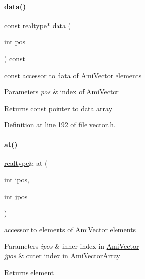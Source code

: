 \paragraph{\texorpdfstring{data()}{data()}\hspace{0.1cm}{\footnotesize\ttfamily [2/2]}}
{\footnotesize\ttfamily const \mbox{\hyperlink{namespaceamici_a1bdce28051d6a53868f7ccbf5f2c14a3}{realtype}}$\ast$ data (\begin{DoxyParamCaption}\item[{int}]{pos }\end{DoxyParamCaption}) const}

const accessor to data of \mbox{\hyperlink{classamici_1_1_ami_vector}{Ami\+Vector}} elements 
\begin{DoxyParams}{Parameters}
{\em pos} & index of \mbox{\hyperlink{classamici_1_1_ami_vector}{Ami\+Vector}} \\
\hline
\end{DoxyParams}
\begin{DoxyReturn}{Returns}
const pointer to data array 
\end{DoxyReturn}


Definition at line 192 of file vector.\+h.

\mbox{\label{classamici_1_1_ami_vector_array_a214f110ad614eb97ec2c6f3b6a9f2c8c}} 
\paragraph{\texorpdfstring{at()}{at()}}
{\footnotesize\ttfamily \mbox{\hyperlink{namespaceamici_a1bdce28051d6a53868f7ccbf5f2c14a3}{realtype}}\& at (\begin{DoxyParamCaption}\item[{int}]{ipos,  }\item[{int}]{jpos }\end{DoxyParamCaption})}

accessor to elements of \mbox{\hyperlink{classamici_1_1_ami_vector}{Ami\+Vector}} elements 
\begin{DoxyParams}{Parameters}
{\em ipos} & inner index in \mbox{\hyperlink{classamici_1_1_ami_vector}{Ami\+Vector}} \\
\hline
{\em jpos} & outer index in \mbox{\hyperlink{classamici_1_1_ami_vector_array}{Ami\+Vector\+Array}} \\
\hline
\end{DoxyParams}
\begin{DoxyReturn}{Returns}
element 
\end{DoxyReturn}


